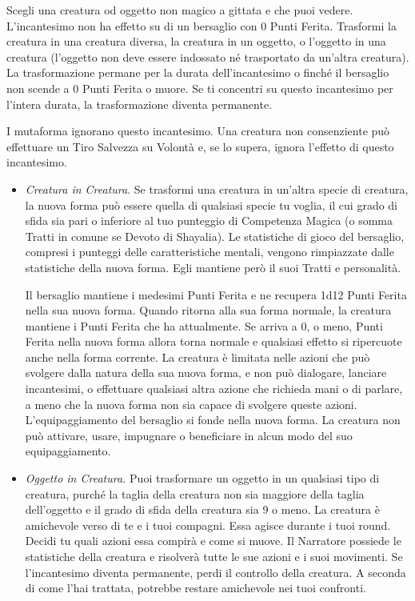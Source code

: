 \begin{multicols}{2}
Scegli una creatura od oggetto non magico a gittata e che puoi vedere. L'incantesimo non ha effetto su di un bersaglio con 0 Punti Ferita. Trasformi la creatura in una creatura diversa, la creatura in un oggetto, o l'oggetto in una creatura (l'oggetto non deve essere indossato né trasportato da un'altra creatura). La trasformazione permane per la durata dell'incantesimo o finché il bersaglio non scende a 0 Punti Ferita o muore. Se ti concentri su questo incantesimo per l'intera durata, la trasformazione diventa permanente.

I mutaforma ignorano questo incantesimo. Una creatura non consenziente può effettuare un Tiro Salvezza su Volontà e, se lo supera, ignora l'effetto di questo incantesimo.

\begin{itemize}[leftmargin=*] \setlength{\itemsep}{0pt}
	\item \emph{Creatura in Creatura}. Se trasformi una creatura in un'altra specie di creatura, la nuova forma può essere quella di qualsiasi specie tu voglia, il cui grado di sfida sia pari o inferiore al tuo punteggio di Competenza Magica (o somma Tratti in comune se Devoto di Shayalia). Le statistiche di gioco del bersaglio, compresi i punteggi delle caratteristiche mentali, vengono rimpiazzate dalle statistiche della nuova forma. Egli mantiene però il suoi Tratti e personalità.

	Il bersaglio mantiene i medesimi Punti Ferita e ne recupera 1d12 Punti Ferita nella sua nuova forma. Quando ritorna alla sua forma normale, la creatura mantiene i Punti Ferita che ha attualmente. Se arriva a 0, o meno, Punti Ferita nella nuova forma allora torna normale e qualsiasi effetto si ripercuote anche nella forma corrente. La creatura è limitata nelle azioni che può svolgere dalla natura della sua nuova forma, e non può dialogare, lanciare incantesimi, o effettuare qualsiasi altra azione che richieda mani o di parlare, a meno che la nuova forma non sia capace di svolgere queste azioni. L'equipaggiamento del bersaglio si fonde nella nuova forma. La creatura non può attivare, usare, impugnare o beneficiare in alcun modo del suo equipaggiamento.

	\item \emph{Oggetto in Creatura.} Puoi trasformare un oggetto in un qualsiasi tipo di creatura, purché la taglia della creatura non sia maggiore della taglia dell'oggetto e il grado di sfida della creatura sia 9 o meno. La creatura è amichevole verso di te e i tuoi compagni. Essa agisce durante i tuoi round. Decidi tu quali azioni essa compirà e come si muove. Il Narratore possiede le statistiche della creatura e risolverà tutte le sue azioni e i suoi movimenti.
	Se l'incantesimo diventa permanente, perdi il controllo della creatura. A seconda di come l'hai trattata, potrebbe restare amichevole nei tuoi confronti.


\end{itemize}
\end{multicols}
